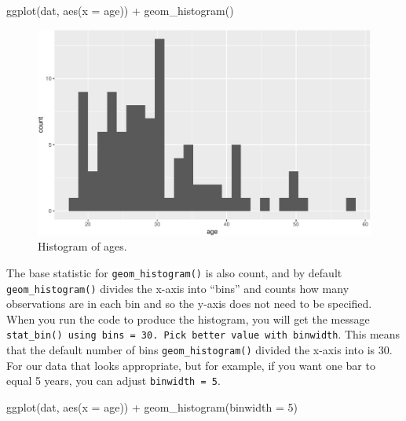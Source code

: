 \documentclass[
  english,
  doc,floatsintext]{apa6}
\newenvironment{Shaded}{\begin{snugshade}}{\end{snugshade}}
\newcommand{\AttributeTok}[1]{\textcolor[rgb]{0.77,0.63,0.00}{#1}}
\newcommand{\DecValTok}[1]{\textcolor[rgb]{0.00,0.00,0.81}{#1}}
\newcommand{\FunctionTok}[1]{\textcolor[rgb]{0.00,0.00,0.00}{#1}}
\newcommand{\NormalTok}[1]{#1}
\newcommand{\SpecialCharTok}[1]{\textcolor[rgb]{0.00,0.00,0.00}{#1}}
\begin{document}
\begin{Shaded}
\begin{Highlighting}[]
\FunctionTok{ggplot}\NormalTok{(dat, }\FunctionTok{aes}\NormalTok{(}\AttributeTok{x =}\NormalTok{ age)) }\SpecialCharTok{+}
  \FunctionTok{geom\_histogram}\NormalTok{()}
\end{Highlighting}
\end{Shaded}

\begin{figure}

{\centering \includegraphics[width=1\linewidth]{images/histogram1-1} 

}

\caption{Histogram of ages.}\label{fig:histogram1}
\end{figure}

The base statistic for \texttt{geom\_histogram()} is also count, and by default \texttt{geom\_histogram()} divides the x-axis into ``bins'' and counts how many observations are in each bin and so the y-axis does not need to be specified. When you run the code to produce the histogram, you will get the message \texttt{stat\_bin()\ using\ bins\ =\ 30.\ Pick\ better\ value\ with\ binwidth}. This means that the default number of bins \texttt{geom\_histogram()} divided the x-axis into is 30. For our data that looks appropriate, but for example, if you want one bar to equal 5 years, you can adjust \texttt{binwidth\ =\ 5}.

\begin{Shaded}
\begin{Highlighting}[]
\FunctionTok{ggplot}\NormalTok{(dat, }\FunctionTok{aes}\NormalTok{(}\AttributeTok{x =}\NormalTok{ age)) }\SpecialCharTok{+}
  \FunctionTok{geom\_histogram}\NormalTok{(}\AttributeTok{binwidth =} \DecValTok{5}\NormalTok{)}
\end{Highlighting}
\end{Shaded}
\end{document}
